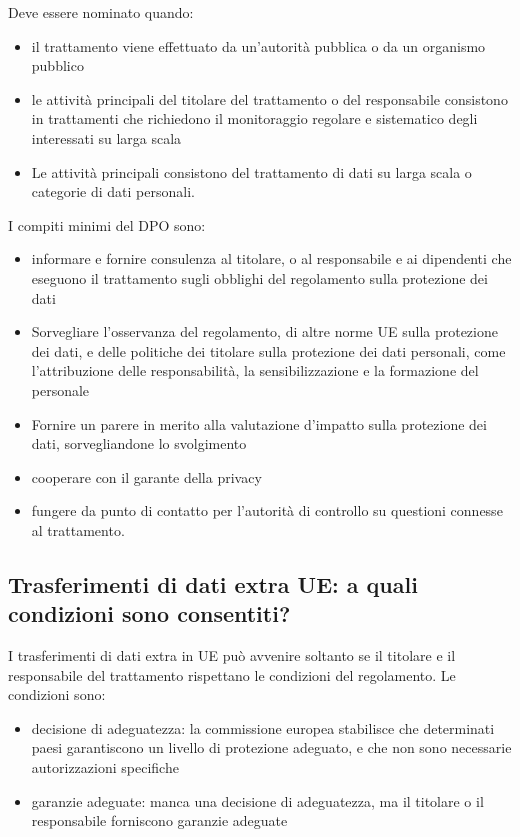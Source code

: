 Deve essere nominato quando:
\begin{itemize}
    \item il trattamento viene effettuato da un'autorità pubblica o da un organismo pubblico
    \item le attività principali del titolare del trattamento o del responsabile consistono in trattamenti che richiedono il monitoraggio regolare e sistematico degli interessati su larga scala
    \item Le attività principali consistono del trattamento di dati su larga scala o categorie di dati personali.
\end{itemize}
I compiti minimi del DPO sono:
\begin{itemize}
    \item informare e fornire consulenza al titolare, o al responsabile e ai dipendenti che eseguono il trattamento sugli obblighi del regolamento sulla protezione dei dati
    \item Sorvegliare l'osservanza del regolamento, di altre norme UE sulla protezione dei dati, e delle politiche dei titolare sulla protezione dei dati personali, come l'attribuzione delle responsabilità, la sensibilizzazione e la formazione del personale
    \item Fornire un parere in merito alla valutazione d'impatto sulla protezione dei dati, sorvegliandone lo svolgimento
    \item cooperare con il garante della privacy
    \item fungere da punto di contatto per l'autorità di controllo su questioni connesse al trattamento.
\end{itemize}

\subsection{Trasferimenti di dati extra UE: a quali condizioni sono consentiti?}

I trasferimenti di dati extra in UE può avvenire soltanto se il titolare e il responsabile del trattamento rispettano le condizioni del regolamento.
Le condizioni sono:
\begin{itemize}
    \item decisione di adeguatezza: la commissione europea stabilisce che determinati paesi garantiscono un livello di protezione adeguato, e che non sono necessarie autorizzazioni specifiche
    \item garanzie adeguate: manca una decisione di adeguatezza, ma il titolare o il responsabile forniscono garanzie adeguate
\end{itemize}

